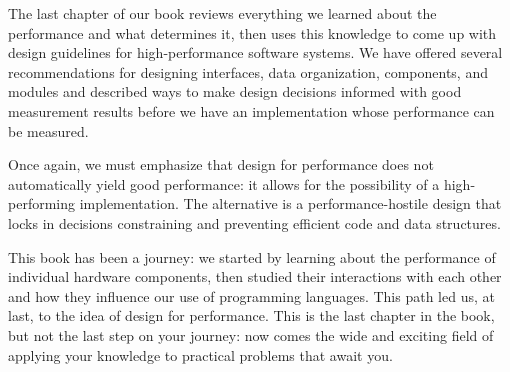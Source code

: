 The last chapter of our book reviews everything we learned about the performance and what determines it, then uses this knowledge to come up with design guidelines for high-performance software systems. We have offered several recommendations for designing interfaces, data organization, components, and modules and described ways to make design decisions informed with good measurement results before we have an implementation whose performance can be measured.

Once again, we must emphasize that design for performance does not automatically yield good performance: it allows for the possibility of a high-performing implementation. The alternative is a performance-hostile design that locks in decisions constraining and preventing efficient code and data structures.

This book has been a journey: we started by learning about the performance of individual hardware components, then studied their interactions with each other and how they influence our use of programming languages. This path led us, at last, to the idea of design for performance. This is the last chapter in the book, but not the last step on your journey: now comes the wide and exciting field of applying your knowledge to practical problems that await you.